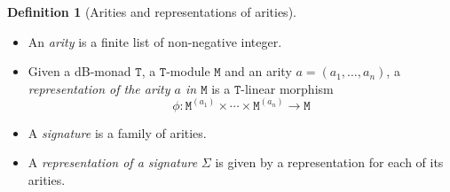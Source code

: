 \documentclass[a4paper,twoside,12pt]{article}
\theoremstyle{definition}
\newtheorem{definition}{Definition}
\theoremstyle{remark}
\newcommand{\TT}{\mathtt{T}}
\newcommand{\MM}{\mathtt{M}}
\begin{document}
\begin{definition}[Arities and representations of arities]
  \hfill
  \begin{itemize}
  \item An \emph{arity} is a finite list of non-negative integer.
  \item Given a dB-monad $\TT$, a $\TT$-module $\MM$ and an arity
    $a=(a_1,\dots,a_n)$, a \emph{representation of the arity $a$ in
      $\MM$} is a $\TT$-linear morphism
    \begin{equation*}
      \phi:\MM^{(a_1)}\times\cdots\times\MM^{(a_n)} \longrightarrow \MM
    \end{equation*}
  \item A \emph{signature} is a family of arities.
  \item A \emph{representation of a signature} $\Sigma$ is given by a
    representation for each of its arities.
  \end{itemize}
\end{definition}
\end{document}
